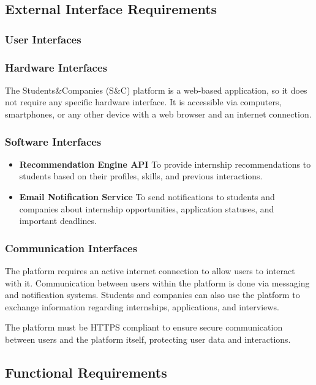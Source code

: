 \subsection{External Interface Requirements}
\subsubsection{User Interfaces}
\subsubsection{Hardware Interfaces}
The Students\&Companies (S\&C) platform is a web-based application, so it does not require any specific hardware interface. It is accessible via computers, smartphones, or any other device with a web browser and an internet connection.
\subsubsection{Software Interfaces}
\begin{itemize}
    \item \textbf{Recommendation Engine API} To provide internship recommendations to students based on their profiles, skills, and previous interactions.
    \item \textbf{Email Notification Service} To send notifications to students and companies about internship opportunities, application statuses, and important deadlines.
\end{itemize}
\subsubsection{Communication Interfaces}
The platform requires an active internet connection to allow users to interact with it. Communication between users within the platform is done via messaging and notification systems. Students and companies can also use the platform to exchange information regarding internships, applications, and interviews.

The platform must be HTTPS compliant to ensure secure communication between users and the platform itself, protecting user data and interactions.




\subsection{Functional Requirements}

